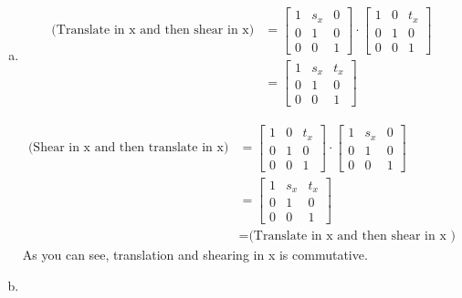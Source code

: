 \documentclass{article} %
\begin{document}
\begin{enumerate}[a)]

\item

\begin{align*}
\text{(Translate in x and then shear in x)} &=
\left[
\begin{matrix}
1 & s_x & 0\\
0 & 1 & 0\\
0 & 0 & 1
\end{matrix}
\right]
\cdot
\left[
\begin{matrix}
1 & 0 & t_x\\
0 & 1 & 0\\
0 & 0 & 1
\end{matrix}
\right]\\
&= \left[
\begin{matrix}
1 & s_x & t_x\\
0 & 1 & 0\\
0 & 0 & 1
\end{matrix}
\right]\end{align*}

\begin{align*}
\text{(Shear in x and then translate in x)} &=
\left[
\begin{matrix}
1 & 0 & t_x\\
0 & 1 & 0\\
0 & 0 & 1
\end{matrix}
\right]
\cdot
\left[
\begin{matrix}
1 & s_x & 0\\
0 & 1 & 0\\
0 & 0 & 1
\end{matrix}
\right]\\
&= \left[
\begin{matrix}
1 & s_x & t_x\\
0 & 1 & 0\\
0 & 0 & 1
\end{matrix}
\right]\\
&= \text{(Translate in x and then shear in x )}
\end{align*}
As you can see, translation and shearing in x is commutative.

\item


\end{enumerate}
\end{document}
